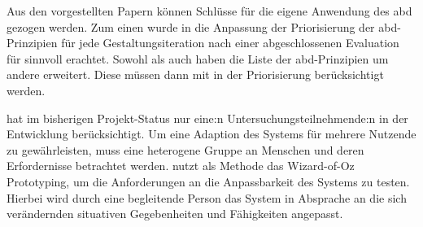 \documentclass[sigchi-a,screen,nonacm,language=german]{acmart}
\theoremstyle{acmdefinition}
\begin{document}
Aus den vorgestellten Papern können Schlüsse für die eigene Anwendung des \ac{abd} gezogen werden. Zum einen wurde in  die Anpassung der Priorisierung der \ac{abd}-Prinzipien für jede Gestaltungsiteration nach einer abgeschlossenen Evaluation für sinnvoll erachtet. Sowohl  als auch  haben die Liste der \ac{abd}-Prinzipien um andere erweitert. Diese müssen dann mit in der Priorisierung berücksichtigt werden.

 hat im bisherigen Projekt-Status nur eine:n Untersuchungsteilnehmende:n in der Entwicklung berücksichtigt. Um eine Adaption des Systems für mehrere Nutzende zu gewährleisten, muss eine heterogene Gruppe an Menschen und deren Erfordernisse betrachtet werden.  nutzt als Methode das Wizard-of-Oz Prototyping, um die Anforderungen an die Anpassbarkeit des Systems zu testen. Hierbei wird durch eine begleitende Person das System in Absprache an die sich verändernden situativen Gegebenheiten und Fähigkeiten angepasst.











\end{document}
